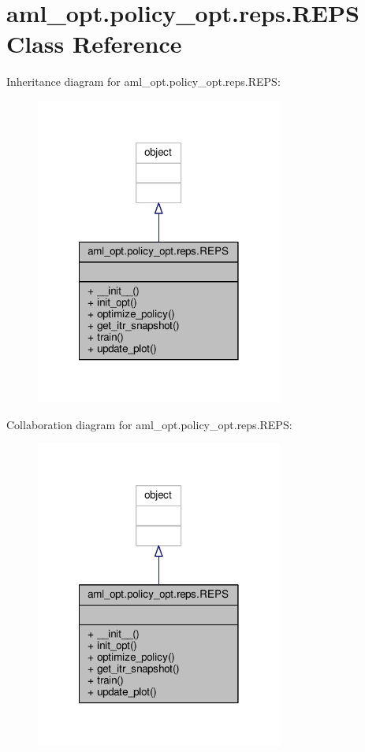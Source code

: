 \hypertarget{classaml__opt_1_1policy__opt_1_1reps_1_1_r_e_p_s}{\section{aml\-\_\-opt.\-policy\-\_\-opt.\-reps.\-R\-E\-P\-S Class Reference}
\label{classaml__opt_1_1policy__opt_1_1reps_1_1_r_e_p_s}
}


Inheritance diagram for aml\-\_\-opt.\-policy\-\_\-opt.\-reps.\-R\-E\-P\-S\-:
\nopagebreak
\begin{figure}[H]
\begin{center}
\leavevmode
\includegraphics[width=230pt]{classaml__opt_1_1policy__opt_1_1reps_1_1_r_e_p_s__inherit__graph}
\end{center}
\end{figure}


Collaboration diagram for aml\-\_\-opt.\-policy\-\_\-opt.\-reps.\-R\-E\-P\-S\-:
\nopagebreak
\begin{figure}[H]
\begin{center}
\leavevmode
\includegraphics[width=230pt]{classaml__opt_1_1policy__opt_1_1reps_1_1_r_e_p_s__coll__graph}
\end{center}
\end{figure}
